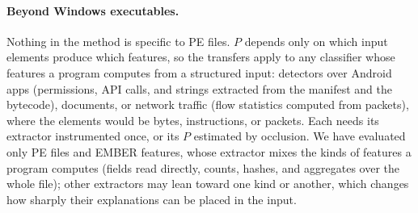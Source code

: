 \paragraph{Beyond Windows executables.} Nothing in the method is specific to PE files. $P$ depends only on which
input elements produce which features, so the transfers apply to any classifier whose features a program computes from
a structured input: detectors over Android apps (permissions, API calls, and strings extracted from the manifest and
the bytecode), documents, or network traffic (flow statistics computed from packets), where the elements would be
bytes, instructions, or packets. Each needs its extractor instrumented once, or its $P$ estimated by occlusion. We have
evaluated only PE files and EMBER features, whose extractor mixes the kinds of features a program computes (fields
read directly, counts, hashes, and aggregates over the whole file); other extractors may lean toward one kind or
another, which changes how sharply their explanations can be placed in the input.

